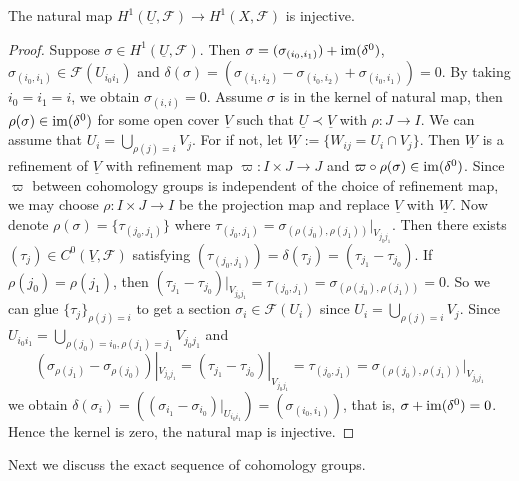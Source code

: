 \begin{prop}\label{H^1(U) to H^1(X)}
    The natural map $H^1(\underline{U},\mathcal{F})\to H^1(X,\mathcal{F})$ is injective.
\end{prop}
\begin{proof}
    Suppose $\sigma\in H^1(\underline{U},\mathcal{F})$.
    Then $\sigma=(\sigma_{(i_0,i_1)})+\operatorname{im}(\delta^0)$, $\sigma_{(i_0,i_1)}\in\mathcal{F}(U_{i_0i_1})$ and $\delta(\sigma)=(\sigma_{(i_1,i_2)}-\sigma_{(i_0,i_2)}+\sigma_{(i_0,i_1)})=0$.
    By taking $i_0=i_1=i$, we obtain $\sigma_{(i,i)}=0$.
    Assume $\sigma$ is in the kernel of natural map, then $\rho(\sigma)\in\operatorname{im}(\delta^0)$ for some open cover $\underline{V}$ such that $\underline{U}\prec\underline{V}$ with $\rho:J\to I$. 
    We can assume that $U_i=\bigcup_{\rho(j)=i}V_j$.
    For if not, let $\underline{W}:=\{W_{ij}=U_i\cap V_j\}$.
    Then $\underline{W}$ is a refinement of $\underline{V}$ with refinement map $\varpi:I\times J\to J$ and $\varpi\circ\rho(\sigma)\in\operatorname{im}(\delta^0)$.
    Since $\varpi$ between cohomology groups is independent of the choice of refinement map, we may choose $\rho:I\times J\to I$ be the projection map and replace $\underline{V}$ with $\underline{W}$.
    Now denote $\rho(\sigma)=\{\tau_{(j_0,j_1)}\}$ where $\tau_{(j_0,j_1)}=\sigma_{(\rho(j_0),\rho(j_1))}|_{V_{j_0j_1}}$.
    Then there exists $(\tau_j)\in C^0(\underline{V},\mathcal{F})$ satisfying $(\tau_{(j_0,j_1)})=\delta(\tau_j)=(\tau_{j_1}-\tau_{j_0})$.
    If $\rho(j_0)=\rho(j_1)$, then $(\tau_{j_1}-\tau_{j_0})|_{V_{j_0j_1}}=\tau_{(j_0,j_1)}=\sigma_{(\rho(j_0),\rho(j_1))}=0$.
    So we can glue $\{\tau_j\}_{\rho(j)=i}$ to get a section $\sigma_i\in\mathcal{F}(U_i)$ since $U_i=\bigcup_{\rho(j)=i}V_j$.
    Since $U_{i_0i_1}=\bigcup_{\rho(j_0)=i_0,\rho(j_1)=j_1}V_{j_0j_1}$ and 
    \[(\sigma_{\rho(j_1)}-\sigma_{\rho(j_0)})|_{V_{j_0j_1}}=(\tau_{j_1}-\tau_{j_0})|_{V_{j_0j_1}}=\tau_{(j_0,j_1)}=\sigma_{(\rho(j_0),\rho(j_1))}|_{V_{j_0j_1}}\]
    we obtain $\delta(\sigma_i)=((\sigma_{i_1}-\sigma_{i_0})|_{U_{i_0i_1}})=(\sigma_{(i_0,i_1)})$, that is, $\sigma+\operatorname{im}(\delta^0)=0$.
    Hence the kernel is zero, the natural map is injective.
\end{proof}

Next we discuss the exact sequence of cohomology groups.

